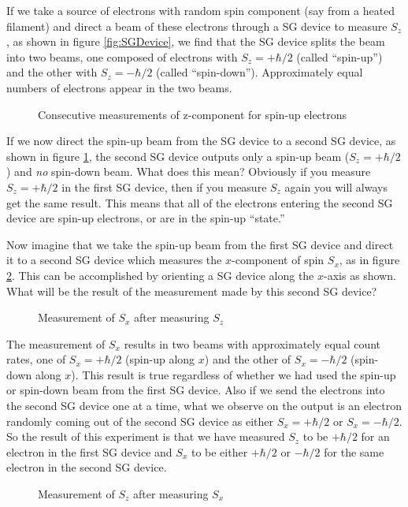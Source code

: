 If we take a source of electrons with random spin component (say from a heated filament) and direct a beam of these electrons through a SG device to measure $S_z$, as shown in figure \ref{fig:SGDevice}, we find that the SG device splits the beam into two beams, one composed of electrons with $S_z = +\hbar/2$ (called ``spin-up'') and the other with $S_z = -\hbar/2$ (called ``spin-down'').  Approximately equal numbers of electrons appear in the two beams.

\begin{figure}[h]
\begin{center}
\caption{Consecutive measurements of z-component for spin-up electrons}
\label{fig:SGDevice2}
\end{center}
\end{figure}

If we now direct the spin-up beam from the SG device to a second SG device, as shown in figure \ref{fig:SGDevice2}, the second SG device outputs only a spin-up beam ($S_z = +\hbar/2$) and {\it no\/} spin-down beam.  What does this mean?  Obviously if you measure $S_z = +\hbar/2$ in the first SG device, then if you measure $S_z$ again you will always get the same result.  This means that all of the electrons entering the second SG device are spin-up electrons, or are in the spin-up ``state.''

Now imagine that we take the spin-up beam from the first SG device and direct it to a second SG device which measures the $x$-component of spin $S_x$, as in figure \ref{fig:SGDevice3}.  This can be accomplished by orienting a SG device along the $x$-axis as shown.  What will be the result of the measurement made by this second SG device?

\begin{figure}[t]
\begin{center}
\caption{Measurement of $S_x$ after measuring $S_z$}
\label{fig:SGDevice3}
\end{center}
\end{figure}

The measurement of $S_x$ results in two beams with approximately equal count rates, one of $S_x = +\hbar/2$ (spin-up along $x$) and the other of $S_x = -\hbar/2$ (spin-down along $x$).  This result is true regardless of whether we had used the spin-up or spin-down beam from the first SG device.  Also if we send the electrons into the second SG device one at a time, what we observe on the output is an electron randomly coming out of the second SG device as either $S_x = +\hbar/2$ or $S_x = -\hbar/2$.  So the result of this experiment is that we have measured $S_z$ to be $+\hbar/2$ for an electron in the first SG device and $S_x$ to be either $+\hbar/2$ or $-\hbar/2$ for the same electron in the second SG device.
\begin{figure}[h]
\begin{center}
\caption{Measurement of $S_z$ after measuring $S_x$}
\label{fig:SGDevice4}
\end{center}
\end{figure}


